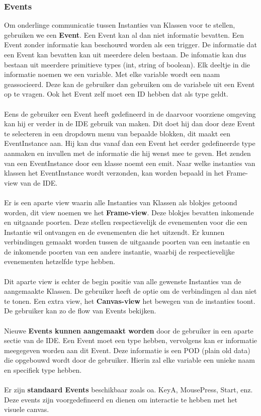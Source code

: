 \documentclass[]{article}
\begin{document}
\subsubsection{Events}
\label{Events}
Om onderlinge communicatie tussen Instanties van Klassen voor te stellen, gebruiken we een \textbf{Event}. Een Event kan al dan niet informatie bevatten. Een Event zonder informatie kan beschouwd worden als een trigger. De informatie dat een Event kan bevatten kan uit meerdere delen bestaan. De infomatie kan dus bestaan uit meerdere primitieve types (int, string of boolean). Elk deeltje in die informatie noemen we een variable. Met elke variable wordt een naam geassocieerd. Deze kan de gebruiker dan gebruiken om de variabele uit een Event op te vragen. Ook het Event zelf moet een ID hebben dat als type geldt.\\\\ Eens de gebruiker een Event heeft gedefineerd in de daarvoor voorziene omgeving kan hij er verder in de IDE gebruik van maken. Dit doet hij dan door deze Event te selecteren in een dropdown menu van bepaalde blokken, dit maakt een EventInstance aan. Hij kan dus vanaf dan een Event het eerder gedefineerde type aanmaken en invullen met de informatie die hij wenst mee te geven. 
Het zenden van een EventInstance door een klasse noemt een emit. Naar welke instanties van klassen het EventInstance wordt verzonden, kan worden bepaald in het Frame-view van de IDE.\\\\
\label{Visuele voorstelling: Frame-view van het canvas.}Er is een aparte view waarin alle Instanties van Klassen als blokjes getoond worden, dit view noemen we het \textbf{Frame-view}. Deze blokjes bevatten inkomende en uitgaande poorten. Deze stellen respectievelijk de evenementen voor die een Instantie wil ontvangen en de evenementen die het uitzendt. Er kunnen verbindingen gemaakt worden tussen de uitgaande poorten van een instantie en de inkomende poorten van een andere instantie, waarbij de respectievelijke evenementen hetzelfde type hebben.\\\\ 
Dit aparte view is echter de begin positie van alle gewenste Instanties van de aangemaakte Klassen. De gebruiker heeft de optie om de verbindingen al dan niet te tonen. Een extra view, het \textbf{Canvas-view} het bewegen van de instanties toont. De gebruiker kan zo de flow van Events bekijken.\\\\  
Nieuwe \textbf{Events kunnen aangemaakt worden} door de gebruiker in een aparte sectie van de IDE. Een Event moet een type hebben, vervolgens kan er informatie meegegeven worden aan dit Event. Deze informatie is een POD (plain old data) die opgebouwd wordt door de gebruiker. Hierin zal elke variable een unieke naam en specifiek type hebben. \\\\
Er zijn \textbf{standaard Events} beschikbaar zoals oa. KeyA, MousePress, Start, enz. Deze events zijn voorgedefineerd en dienen om interactie te hebben met het visuele canvas.  
\end{document}
